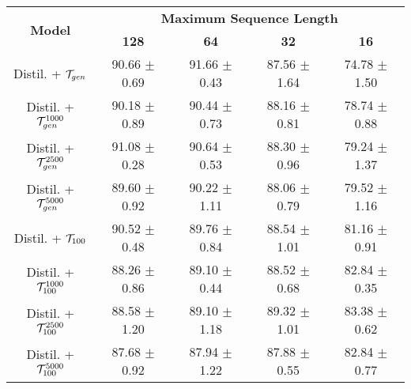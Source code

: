 \begin{table*}[t]
    \begin{subtable}{\textwidth}
    \centering
        \begin{tabular}{ccccc}
            \hline
            
            \multirow{2}{*}{\textbf{Model}}         & \multicolumn{4}{c}{\textbf{Maximum Sequence Length}}  \\          
            
                                                    & \textbf{128}  & \textbf{64}   & \textbf{32}   & \textbf{16}   \\ 
            
            \hline
    
            Distil. + $\mathcal{T}_{gen}$                     & 90.66 $\pm$ 0.69      & 91.66 $\pm$ 0.43      & 87.56 $\pm$ 1.64      & 74.78 $\pm$ 1.50  \\
            Distil. + $\mathcal{T}_{gen}^{1000}$              & 90.18 $\pm$ 0.89      & 90.44 $\pm$ 0.73      & 88.16 $\pm$ 0.81      & 78.74 $\pm$ 0.88  \\
            Distil. + $\mathcal{T}_{gen}^{2500}$              & 91.08 $\pm$ 0.28      & 90.64 $\pm$ 0.53      & 88.30 $\pm$ 0.96      & 79.24 $\pm$ 1.37  \\
            Distil. + $\mathcal{T}_{gen}^{5000}$              & 89.60 $\pm$ 0.92      & 90.22 $\pm$ 1.11      & 88.06 $\pm$ 0.79      & 79.52 $\pm$ 1.16  \\
            Distil. + $\tok100$                     & 90.52 $\pm$ 0.48      & 89.76 $\pm$ 0.84      & 88.54 $\pm$ 1.01      & 81.16 $\pm$ 0.91  \\
            Distil. + $\tok100^{1000}$              & 88.26 $\pm$ 0.86      & 89.10 $\pm$ 0.44      & 88.52 $\pm$ 0.68      & 82.84 $\pm$ 0.35  \\
            Distil. + $\tok100^{2500}$              & 88.58 $\pm$ 1.20      & 89.10 $\pm$ 1.18      & 89.32 $\pm$ 1.01      & 83.38 $\pm$ 0.62  \\
            Distil. + $\tok100^{5000}$              & 87.68 $\pm$ 0.92      & 87.94 $\pm$ 1.22      & 87.88 $\pm$ 0.55      & 82.84 $\pm$ 0.77  \\
            
            \hline
        \end{tabular}
        \caption{ADE}
    \end{subtable}

    \bigskip
    \begin{subtable}{\textwidth}
    \centering
        \begin{tabular}{ccccc}
            \hline
            

\end{tabular}
\end{subtable}
\end{table*}
